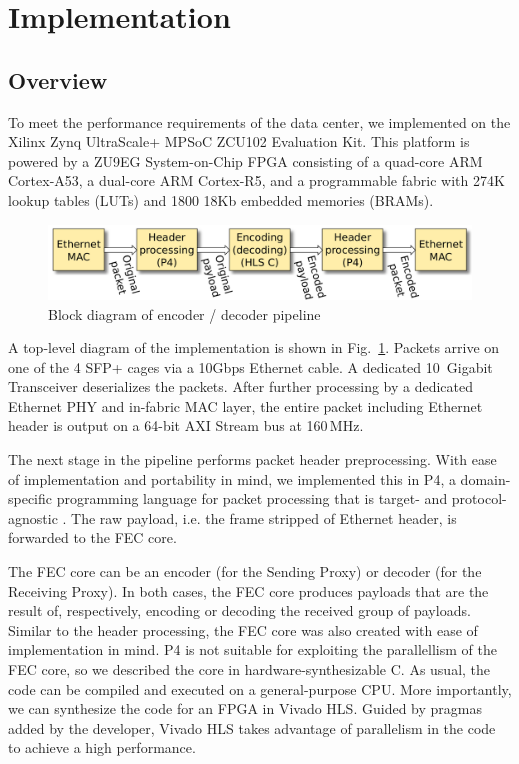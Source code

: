 \section{Implementation}
\label{sec:implementation}

\newcommand{\leicom}[1]{{\color{blue}{[\textbf{Lei Comment:} #1]}}}
\newcommand{\hg}[1]{{\color{green}{[\textbf{Hans Comment:} #1]}}}

\subsection{Overview}

To meet the performance requirements of the data center, we implemented \OurSys
on the Xilinx Zynq UltraScale+ MPSoC ZCU102 Evaluation Kit.  This platform is
powered by a ZU9EG System-on-Chip FPGA consisting of a quad-core ARM Cortex-A53, a
dual-core ARM Cortex-R5, and a programmable fabric with 274K lookup tables
(LUTs) and 1800 18Kb embedded memories (BRAMs).

\begin{figure}
  \centering
  \includegraphics[width=0.4\paperwidth]{Top_level.pdf}
  \caption{\label{fig:toplevel} Block diagram of encoder / decoder pipeline}
\end{figure}

A top-level diagram of the implementation is shown in Fig.~\ref{fig:toplevel}.
Packets arrive on one of the 4 SFP+ cages via a 10Gbps Ethernet cable.
A dedicated 10~Gigabit Transceiver deserializes the packets.  After further
processing by a dedicated Ethernet PHY and in-fabric MAC layer, the entire
packet including Ethernet header is output on a 64-bit AXI Stream bus at 160\,MHz.

The next stage in the pipeline performs packet header preprocessing.  With
ease of implementation and portability in mind, we implemented this in P4, a
domain-specific programming language for packet processing that is target- and
protocol-agnostic \cite{p4_sigcomm_review2014}.  The raw payload, i.e. the frame stripped of Ethernet
header, is forwarded to the FEC core.  

The FEC core can be an encoder (for the Sending Proxy) or decoder (for the
Receiving Proxy).  In both cases, the FEC core
produces payloads that are the result of, respectively, encoding or decoding
the received group of payloads.  Similar to the header processing, the FEC core
was also created with ease of implementation in mind.  P4 is not suitable
for
exploiting the parallellism of the FEC core, so we described the core in
hardware-synthesizable C.  As usual, the code can be compiled and executed on a
general-purpose CPU.  More importantly, we can synthesize the code for an FPGA
in Vivado HLS.  Guided by pragmas added by the developer, Vivado HLS takes
advantage of parallelism in the code to achieve a high performance.

